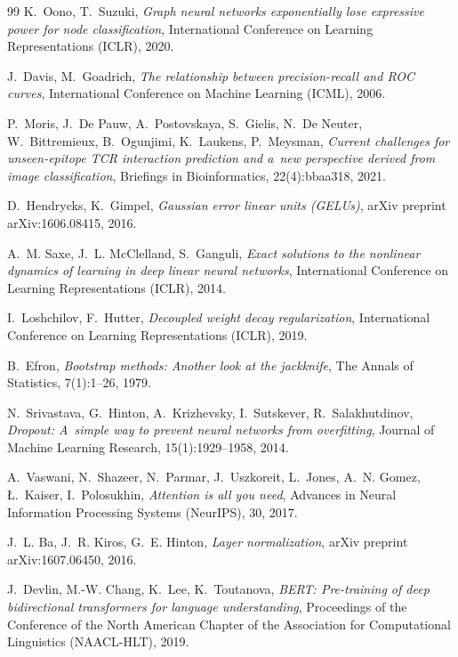 \documentclass{SGGW-thesis}
\begin{document}
\begin{thebibliography}{99}
K.~Oono, T.~Suzuki,
\textit{Graph neural networks exponentially lose expressive power for node classification},
International Conference on Learning Representations (ICLR), 2020.

J.~Davis, M.~Goadrich,
\textit{The relationship between precision-recall and ROC curves},
International Conference on Machine Learning (ICML), 2006.

P.~Moris, J.~De Pauw, A.~Postovskaya, S.~Gielis, N.~De Neuter, W.~Bittremieux, B.~Ogunjimi,
K.~Laukens, P.~Meysman,
\textit{Current challenges for unseen-epitope TCR interaction prediction and a~new perspective
derived from image classification},
Briefings in Bioinformatics, 22(4):bbaa318, 2021.

D.~Hendrycks, K.~Gimpel,
\textit{Gaussian error linear units (GELUs)},
arXiv preprint arXiv:1606.08415, 2016.

A.~M. Saxe, J.~L. McClelland, S.~Ganguli,
\textit{Exact solutions to the nonlinear dynamics of learning in deep linear neural networks},
International Conference on Learning Representations (ICLR), 2014.

I.~Loshchilov, F.~Hutter,
\textit{Decoupled weight decay regularization},
International Conference on Learning Representations (ICLR), 2019.

B.~Efron,
\textit{Bootstrap methods: Another look at the jackknife},
The Annals of Statistics, 7(1):1--26, 1979.

N.~Srivastava, G.~Hinton, A.~Krizhevsky, I.~Sutskever, R.~Salakhutdinov,
\textit{Dropout: A~simple way to prevent neural networks from overfitting},
Journal of Machine Learning Research, 15(1):1929--1958, 2014.

A.~Vaswani, N.~Shazeer, N.~Parmar, J.~Uszkoreit, L.~Jones, A.~N. Gomez, {\L}.~Kaiser,
I.~Polosukhin,
\textit{Attention is all you need},
Advances in Neural Information Processing Systems (NeurIPS), 30, 2017.

J.~L. Ba, J.~R. Kiros, G.~E. Hinton,
\textit{Layer normalization},
arXiv preprint arXiv:1607.06450, 2016.

J.~Devlin, M.-W. Chang, K.~Lee, K.~Toutanova,
\textit{BERT: Pre-training of deep bidirectional transformers for language understanding},
Proceedings of the Conference of the North American Chapter of the Association for
Computational Linguistics (NAACL-HLT), 2019.


\end{thebibliography}
\end{document}
